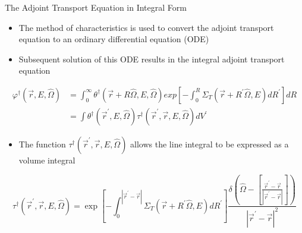 \documentclass{beamer}
\begin{document}
\begin{frame}{The Adjoint Transport Equation in Integral Form}

  \begin{itemize}
    \item The method of characteristics is used to convert the adjoint transport
      equation to an ordinary differential equation (ODE)
      \medskip
    \item Subsequent solution of this ODE results in the integral adjoint 
      transport equation
  \end{itemize}
  \begin{align}
    \varphi^{\dagger}(\vec{r},E,\hat{\Omega}) & = 
    \int_0^{\infty} \theta^{\dagger}(\vec{r} + R\hat{\Omega},E,\hat{\Omega})
    exp\left[-\int_0^R \Sigma_T(\vec{r}+R^{'}\hat{\Omega},E)dR^{'} \right] dR
    \nonumber \\
    & = \int \theta^{\dagger}(\vec{r}^{'},E,\hat{\Omega}) 
    \tau^{\dagger}(\vec{r}^{'},\vec{r},E,\hat{\Omega}) dV^{'} \nonumber
  \end{align}

  \begin{itemize}
    \item The function $\tau^{\dagger}(\vec{r}^{'},\vec{r},E,\hat{\Omega})$ allows
      the line integral to be expressed as a volume integral
  \end{itemize}
  \begin{equation*}
    \tau^{\dagger}(\vec{r}^{'},\vec{r},E,\hat{\Omega}) = 
    \exp{\left[-\int_0^{|\vec{r}^{'} - \vec{r}|} 
        \Sigma_T(\vec{r}+R^{'}\hat{\Omega},E)dR^{'} \right]}
    \frac{\delta \left(\hat{\Omega} - \left[\frac{\vec{r}^{'} - \vec{r}}
        {|\vec{r}^{'} - \vec{r}|}\right]\right)}
         {|\vec{r}^{'} - \vec{r}|^2}
  \end{equation*}

\end{frame}
\end{document}
